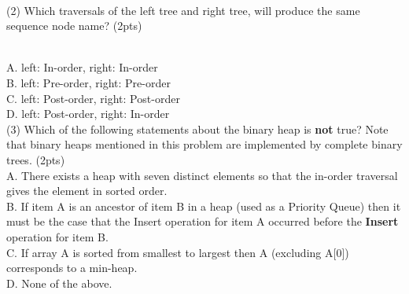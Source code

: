 \documentclass[10.5pt]{article}
\begin{document}
~\\
(2) Which traversals of the left tree and right tree, will produce the same sequence node name? (2pts) \\
\begin{minipage}{1\textwidth}
    \centering
\end{minipage} \\
A. left: In-order, right: In-order \\
B. left: Pre-order, right: Pre-order \\
C. left: Post-order, right: Post-order \\
D. left: Post-order, right: In-order
~\\

(3) Which of the following statements about the binary heap is \textbf{not} true? Note that binary heaps mentioned in this problem are implemented by complete binary trees. (2pts) \\
A. There exists a heap with seven distinct elements so that the in-order traversal gives the element in sorted order. \\
B. If item A is an ancestor of item B in a heap (used as a Priority Queue) then it must be the case that the Insert operation for item A occurred before the \textbf{Insert} operation for item B.\\
C. If array A is sorted from smallest to largest then A (excluding A[0]) corresponds to a min-heap. \\
D. None of the above.
\end{document}
